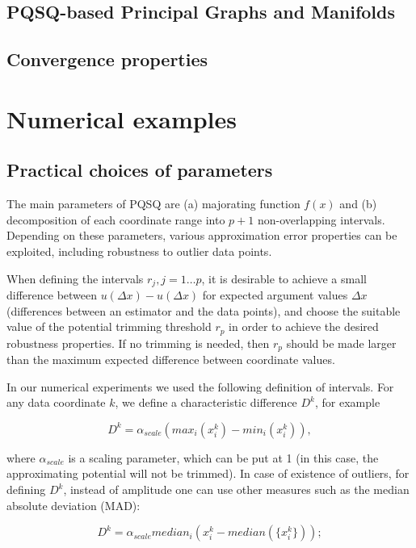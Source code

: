 \documentclass[preprint,12pt]{elsarticle}
\begin{document}
\subsection{PQSQ-based Principal Graphs and Manifolds}


\subsection{Convergence properties}


\section{Numerical examples}

\subsection{Practical choices of parameters}

The main parameters of PQSQ are (a) majorating function $f(x)$ and (b) decomposition of each coordinate range into $p+1$ non-overlapping intervals.
Depending on these parameters, various approximation error properties can be exploited, including robustness to outlier data points.

When defining the intervals $r_j, j=1\dots p$, it is desirable to achieve a small difference between $u(\Delta x)-u(\Delta x)$ for expected argument values $\Delta x$ (differences between an estimator and the data points), and choose the suitable value of the potential trimming threshold $r_p$ in order to achieve the desired robustness properties. If no trimming is needed, then $r_p$ should be made larger than the maximum expected difference between coordinate values.

In our numerical experiments we used the following definition of intervals. For any data coordinate $k$, we define a characteristic difference $D^k$, for example

\begin{equation}\label{characteristic_distance_amplitude}
D^k = \alpha_{scale}(max_i(x_i^k)-min_i(x_i^k)),
\end{equation}

\noindent where $\alpha_{scale}$ is a scaling parameter, which can be put at 1 (in this case, the approximating potential will not be trimmed). In case of existence of outliers, for defining $D^k$, instead of amplitude one can use other measures such as the median absolute deviation (MAD):

\begin{equation}\label{characteristic_distance_mad}
D^k = \alpha_{scale}median_i(x_i^k-median(\{x_i^k\}));
\end{equation}
\end{document}
